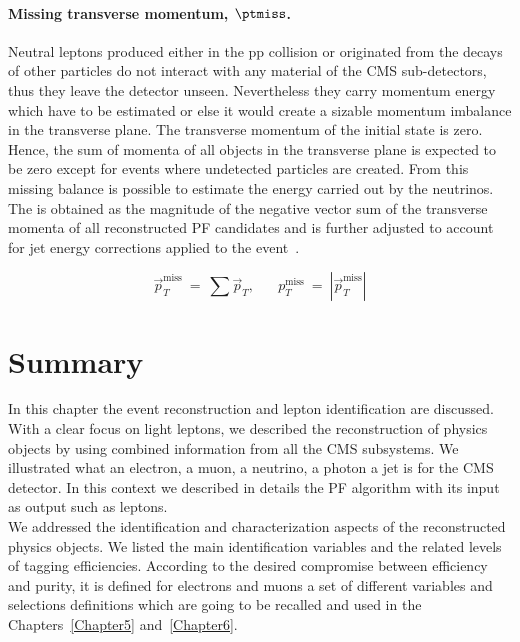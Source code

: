 \paragraph{Missing transverse momentum,
  $\boldsymbol{\ptmiss}$.}\label{sec:c2ptmiss}
Neutral leptons produced either in the pp collision or originated from
the decays of other particles do not interact with any material of the CMS
sub-detectors, thus they leave the detector unseen. Nevertheless they
carry momentum energy which have to be estimated or else it would
create a sizable momentum imbalance in the transverse plane. The
transverse momentum of the initial state is zero. Hence, the sum of 
momenta of all objects in the transverse plane is
expected to be zero except for events where undetected particles are
created. From this missing balance is possible to estimate the energy
carried out by the neutrinos. \\
The \ptmiss is obtained as the magnitude of the negative vector sum of the transverse momenta of 
all reconstructed PF candidates and is further adjusted to account for
jet energy corrections applied to the event~\cite{CMS-PAS-JME-16-004}.
\begin{linenomath}
  \begin{equation}
    \label{eq:c2ptmiss}
    \overrightarrow{p}_T^{\text{miss}} \: = \: \sum \overrightarrow{p}_T,
    \;\;\; \;\;\; p_T^{\text{miss}} \: = \: |\overrightarrow{p}_T^{\text{miss}}|
  \end{equation}
\end{linenomath}

\clearpage
\section{Summary}\label{sec:summaryC3}

In this chapter the event reconstruction and lepton identification are discussed.\\
With a clear focus on light leptons, we described the reconstruction
of physics objects by using combined information from all the CMS
subsystems. We illustrated what an electron, a muon, a
neutrino, a photon a jet is for the CMS detector. In this context we
described in details the PF algorithm with its input as output such as
leptons. \\
We addressed the identification and characterization aspects of the
reconstructed physics objects. We listed the main identification
variables and the related levels of tagging efficiencies.
According to the desired compromise between efficiency and purity, 
it is defined for electrons and muons a set of different variables and selections definitions
which are going to be recalled and used in the Chapters~\ref{Chapter5}
and~\ref{Chapter6}.\\

